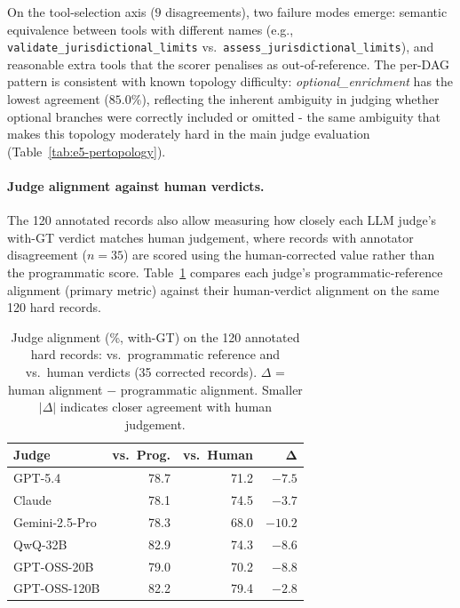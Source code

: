 On the tool-selection axis ($9$ disagreements), two failure modes emerge: semantic equivalence between tools with different names (e.g., \texttt{validate\_jurisdictional\_limits} vs.\ \texttt{assess\_jurisdictional\_limits}), and reasonable extra tools that the scorer penalises as out-of-reference. The per-DAG pattern is consistent with known topology difficulty: \emph{optional\_enrichment} has the lowest agreement ($85.0\%$), reflecting the inherent ambiguity in judging whether optional branches were correctly included or omitted - the same ambiguity that makes this topology moderately hard in the main judge evaluation (Table~\ref{tab:e5-pertopology}).

\paragraph{Judge alignment against human verdicts.}
The 120 annotated records also allow measuring how closely each LLM judge's with-GT verdict matches human judgement, where records with annotator disagreement ($n{=}35$) are scored using the human-corrected value rather than the programmatic score. Table~\ref{tab:judge-vs-human} compares each judge's programmatic-reference alignment (primary metric) against their human-verdict alignment on the same 120 hard records.

\begin{table}[!htbp]
\centering
\small
\setlength{\tabcolsep}{6pt}
\renewcommand{\arraystretch}{1.10}
\caption{Judge alignment (\%, with-GT) on the 120 annotated hard records: vs.\ programmatic reference and vs.\ human verdicts (35 corrected records). $\Delta$ = human alignment $-$ programmatic alignment. Smaller $|\Delta|$ indicates closer agreement with human judgement.}
\label{tab:judge-vs-human}
\begin{tabular}{@{}lrrr@{}}
\toprule
\textbf{Judge} & \textbf{vs.\ Prog.} & \textbf{vs.\ Human} & $\boldsymbol{\Delta}$ \\
\midrule
GPT-5.4         & 78.7 & 71.2 & $-7.5$ \\
Claude          & 78.1 & 74.5 & $-3.7$ \\
Gemini-2.5-Pro  & 78.3 & 68.0 & $-10.2$ \\
QwQ-32B         & 82.9 & 74.3 & $-8.6$ \\
GPT-OSS-20B     & 79.0 & 70.2 & $-8.8$ \\
GPT-OSS-120B    & 82.2 & 79.4 & $-2.8$ \\
\bottomrule
\end{tabular}
\end{table}

